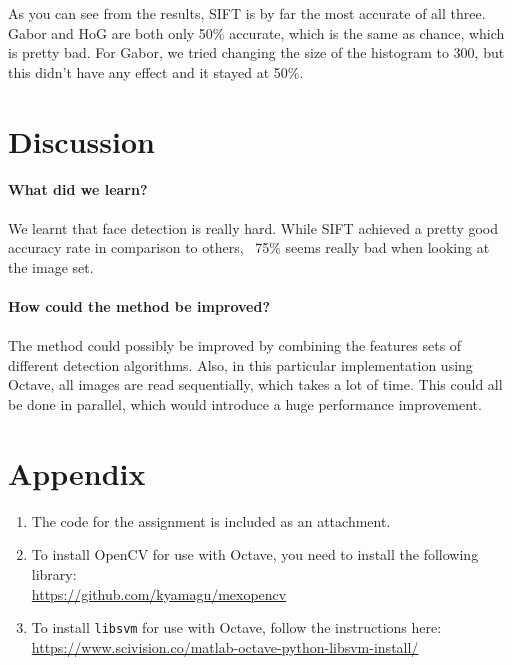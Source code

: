 \documentclass{article}
\begin{document}
  As you can see from the results, SIFT is by far the most accurate of all three. Gabor and HoG are both only 50\% accurate, which is the same as chance, which is pretty bad. For Gabor, we tried changing the size of the histogram to 300, but this didn't have any effect and it stayed at 50\%.

  \newpage

  \section{Discussion}

  \textbf{What did we learn?}\\
  \\
  We learnt that face detection is really hard. While SIFT achieved a pretty good accuracy rate in comparison to others, ~75\% seems really bad when looking at the image set.\\
  \\
  \textbf{How could the method be improved?}\\
  \\
  The method could possibly be improved by combining the features sets of different detection algorithms. Also, in this particular implementation using Octave, all images are read sequentially, which takes a lot of time. This could all be done in parallel, which would introduce a huge performance improvement.

  \newpage

  \section{Appendix}

  \begin{enumerate}
    \item The code for the assignment is included as an attachment.
    \item To install OpenCV for use with Octave, you need to install the following library:\\
          \url{https://github.com/kyamagu/mexopencv}
    \item To install \texttt{libsvm} for use with Octave, follow the instructions here:\\
          \url{https://www.scivision.co/matlab-octave-python-libsvm-install/}
  \end{enumerate}
\end{document}
